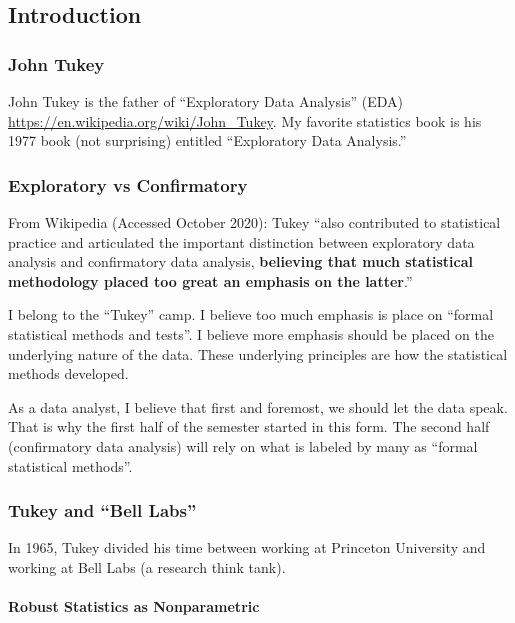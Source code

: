 \documentclass[
]{article}
\begin{document}
\hypertarget{introduction}{%
\subsection{Introduction}\label{introduction}}

\hypertarget{john-tukey}{%
\subsubsection{John Tukey}\label{john-tukey}}

John Tukey is the father of ``Exploratory Data Analysis'' (EDA)
\url{https://en.wikipedia.org/wiki/John_Tukey}. My favorite statistics
book is his 1977 book (not surprising) entitled ``Exploratory Data
Analysis.''

\hypertarget{exploratory-vs-confirmatory}{%
\subsubsection{Exploratory vs
Confirmatory}\label{exploratory-vs-confirmatory}}

From Wikipedia (Accessed October 2020): Tukey ``also contributed to
statistical practice and articulated the important distinction between
exploratory data analysis and confirmatory data analysis,
\textbf{believing that much statistical methodology placed too great an
emphasis on the latter}.''

I belong to the ``Tukey'' camp. I believe too much emphasis is place on
``formal statistical methods and tests''. I believe more emphasis should
be placed on the underlying nature of the data. These underlying
principles are how the statistical methods developed.

As a data analyst, I believe that first and foremost, we should let the
data speak. That is why the first half of the semester started in this
form. The second half (confirmatory data analysis) will rely on what is
labeled by many as ``formal statistical methods''.

\hypertarget{tukey-and-bell-labs}{%
\subsubsection{Tukey and ``Bell Labs''}\label{tukey-and-bell-labs}}

In 1965, Tukey divided his time between working at Princeton University
and working at Bell Labs (a research think tank).

\hypertarget{robust-statistics-as-nonparametric}{%
\paragraph{Robust Statistics as
Nonparametric}\label{robust-statistics-as-nonparametric}}
\end{document}
